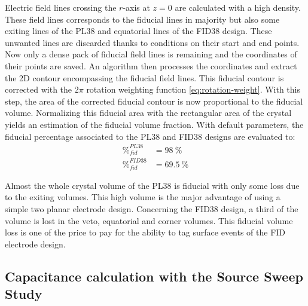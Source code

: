 Electric field lines crossing the $r$-axis at $z=0$ are calculated with a high density. These field lines corresponds to the fiducial lines in majority but also some exiting lines of the PL38 and equatorial lines of the FID38 design. These unwanted lines are discarded thanks to conditions on their start and end points. Now only a dense pack of fiducial field lines is remaining and the coordinates of their points are saved. An algorithm then processes the coordinates and extract the 2D contour encompassing the fiducial field lines. This fiducial contour is corrected with the $2\pi$ rotation weighting function \ref{eq:rotation-weight}. With this step, the area of the corrected fiducial contour is now proportional to the fiducial volume. Normalizing this fiducial area with the rectangular area of the crystal yields an estimation of the fiducial volume fraction. With default parameters, the fiducial percentage associated to the PL38 and FID38 designs are evaluated to:
\begin{align}
\%_{fid}^{PL38} &= \SI{98}{\percent} \\
\%_{fid}^{FID38} &= \SI{69.5}{\percent}
\end{align}

Almost the whole crystal volume of the PL38 is fiducial with only some loss due to the exiting volumes. This high volume is the major advantage of using a simple two planar electrode design. Concerning the FID38 design, a third of the volume is lost in the veto, equatorial and corner volumes. This fiducial volume loss is one of the price to pay for the ability to tag surface events of the FID electrode design.


\subsection{Capacitance calculation with the Source Sweep Study}
\label{par:capacitance-matrix}
\label{par:fid38-capacitance}


